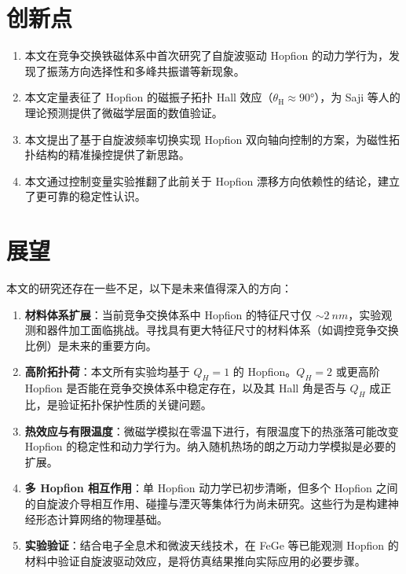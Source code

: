 \section{创新点}

\begin{enumerate}[label=(\arabic*)]
  \item 本文在竞争交换铁磁体系中首次研究了自旋波驱动 Hopfion 的动力学行为，发现了振荡方向选择性和多峰共振谱等新现象。
  \item 本文定量表征了 Hopfion 的磁振子拓扑 Hall 效应（$\theta_{\text{H}} \approx \ang{90}$），为 Saji 等人的理论预测提供了微磁学层面的数值验证。
  \item 本文提出了基于自旋波频率切换实现 Hopfion 双向轴向控制的方案，为磁性拓扑结构的精准操控提供了新思路。
  \item 本文通过控制变量实验推翻了此前关于 Hopfion 漂移方向依赖性的结论，建立了更可靠的稳定性认识。
\end{enumerate}


\section{展望}

本文的研究还存在一些不足，以下是未来值得深入的方向：

\begin{enumerate}[label=(\arabic*)]
  \item \textbf{材料体系扩展}：当前竞争交换体系中 Hopfion 的特征尺寸仅 $\sim\SI{2}{nm}$，实验观测和器件加工面临挑战。寻找具有更大特征尺寸的材料体系（如调控竞争交换比例）是未来的重要方向。
  \item \textbf{高阶拓扑荷}：本文所有实验均基于 $Q_H = 1$ 的 Hopfion。$Q_H = 2$ 或更高阶 Hopfion 是否能在竞争交换体系中稳定存在，以及其 Hall 角是否与 $Q_H$ 成正比，是验证拓扑保护性质的关键问题。
  \item \textbf{热效应与有限温度}：微磁学模拟在零温下进行，有限温度下的热涨落可能改变 Hopfion 的稳定性和动力学行为。纳入随机热场的朗之万动力学模拟是必要的扩展。
  \item \textbf{多 Hopfion 相互作用}：单 Hopfion 动力学已初步清晰，但多个 Hopfion 之间的自旋波介导相互作用、碰撞与湮灭等集体行为尚未研究。这些行为是构建神经形态计算网络的物理基础。
  \item \textbf{实验验证}：结合电子全息术和微波天线技术，在 FeGe 等已能观测 Hopfion 的材料中验证自旋波驱动效应，是将仿真结果推向实际应用的必要步骤。
\end{enumerate}
